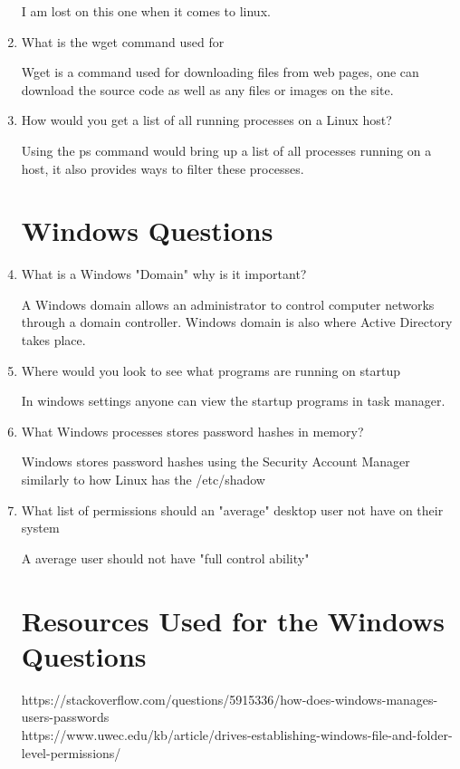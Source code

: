 \documentclass{exam}
\begin{document}
\begin{enumerate}
	\begin{solution}
		I am lost on this one when it comes to linux. 
	\end{solution}
	\item  What is the wget command used for 
	\begin{solution}
		Wget is a command used for downloading files from web pages, one can download the source code as well as any files or images on the site. 
	\end{solution}
	\item How would you get a list of all running processes on a Linux host?
	\begin{solution}
		Using the ps command would bring up a list of all processes running on a host, it also provides ways to filter these processes. 
	\end{solution}
	\section*{Windows Questions}
	\item What is a Windows "Domain" why is it important?
	\begin{solution}
		A Windows domain allows an administrator to control computer networks through a domain controller. Windows domain is also where Active Directory takes place. 
	\end{solution}
	\item Where would you look to see what programs are running on startup
	\begin{solution}
		In windows settings anyone can view the startup programs in task manager. 
	\end{solution}
	\item What Windows processes stores password hashes in memory?
	\begin{solution}
		Windows stores password hashes using the Security Account Manager similarly to how Linux has the /etc/shadow
	\end{solution}
	\item What list of permissions should an "average" desktop user not have on their system
	\begin{solution}
		A average user should not have "full control ability" 
	\end{solution}
	 
	\section*{Resources Used for the Windows Questions}
	 https://stackoverflow.com/questions/5915336/how-does-windows-manages-users-passwords \\
	 https://www.uwec.edu/kb/article/drives-establishing-windows-file-and-folder-level-permissions/
	\end{enumerate}
\end{document}
